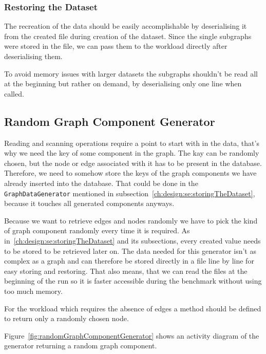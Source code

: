 \subsubsection{Restoring the Dataset}
\label{ch:design:se:restoringTheDataset}
The recreation of the data should be easily accomplishable by deserialising it from the created file during creation of the dataset.
Since the single subgraphs were stored in the file,
we can pass them to the workload directly after deserialising them.

To avoid memory issues with larger datasets the subgraphs shouldn't be read all at the beginning but rather on demand,
by deserialising only one line when called.

\subsection{Random Graph Component Generator}
Reading and scanning operations require a point to start with in the data,
that's why we need the key of some component in the graph.
The kay can be randomly chosen,
but the node or edge associated with it has to be present in the database.
Therefore,
we need to somehow store the keys of the graph components we have already inserted into the database.
That could be done in the \texttt{GraphDataGenerator} mentioned in subsection~\ref{ch:design:se:storingTheDataset},
because it touches all generated components anyways.

Because we want to retrieve edges and nodes randomly we have to pick the kind of graph component randomly every time it is required.
As in~\ref{ch:design:se:storingTheDataset} and its subsections,
every created value needs to be stored to be retrieved later on.
The data needed for this generator isn't as complex as a graph and can therefore be stored directly in a file line by line for easy storing and restoring.
That also means,
that we can read the files at the beginning of the run so it is faster accessible during the benchmark without using too much memory.

For the workload which requires the absence of edges a method should be defined to return only a randomly chosen node.

Figure~\ref{fig:randomGraphComponentGenerator} shows an activity diagram of the generator returning a random graph component.


